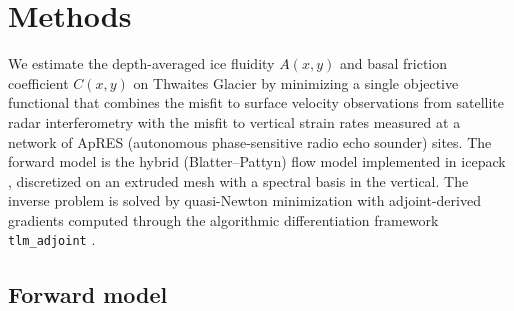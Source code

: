 
\section{Methods}
\label{sec:methods}

We estimate the depth-averaged ice fluidity $A(x,y)$ and basal
friction coefficient $C(x,y)$ on Thwaites Glacier by minimizing a
single objective functional that combines the misfit to surface
velocity observations from satellite radar interferometry with the
misfit to vertical strain rates measured at a network of ApRES
(autonomous phase-sensitive radio echo sounder) sites. The forward
model is the hybrid (Blatter--Pattyn) flow model implemented in
icepack \citep{Shapero2021}, discretized on an extruded mesh with a
spectral basis in the vertical. The inverse problem is solved by
quasi-Newton minimization with adjoint-derived gradients computed
through the algorithmic differentiation framework
\texttt{tlm\_adjoint} \citep{Maddison2019}.

\subsection{Forward model}
\label{sec:forward}

